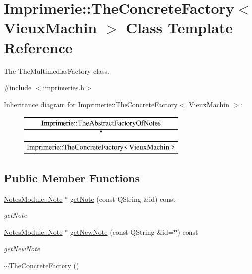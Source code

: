 \hypertarget{class_imprimerie_1_1_the_concrete_factory}{\section{Imprimerie\-:\-:The\-Concrete\-Factory$<$ Vieux\-Machin $>$ Class Template Reference}
\label{class_imprimerie_1_1_the_concrete_factory}
}


The The\-Multimedias\-Factory class.  




{\ttfamily \#include $<$imprimeries.\-h$>$}

Inheritance diagram for Imprimerie\-:\-:The\-Concrete\-Factory$<$ Vieux\-Machin $>$\-:\begin{figure}[H]
\begin{center}
\leavevmode
\includegraphics[height=2.000000cm]{class_imprimerie_1_1_the_concrete_factory}
\end{center}
\end{figure}
\subsection*{Public Member Functions}
\begin{DoxyCompactItemize}
\item 
\hyperlink{class_notes_module_1_1_note}{Notes\-Module\-::\-Note} $\ast$ \hyperlink{class_imprimerie_1_1_the_concrete_factory_a0a3ab29272e976eeebee58387527c3d1}{get\-Note} (const Q\-String \&id) const 
\begin{DoxyCompactList}\small\item\em get\-Note \end{DoxyCompactList}\item 
\hyperlink{class_notes_module_1_1_note}{Notes\-Module\-::\-Note} $\ast$ \hyperlink{class_imprimerie_1_1_the_concrete_factory_a6788a3d745d537f158145933efcd94a0}{get\-New\-Note} (const Q\-String \&id=\char`\"{}\char`\"{}) const 
\begin{DoxyCompactList}\small\item\em get\-New\-Note \end{DoxyCompactList}\item 
\hyperlink{class_imprimerie_1_1_the_concrete_factory_a491e456e81184103e1e25751b5c512e9}{$\sim$\-The\-Concrete\-Factory} ()
\end{DoxyCompactItemize}


